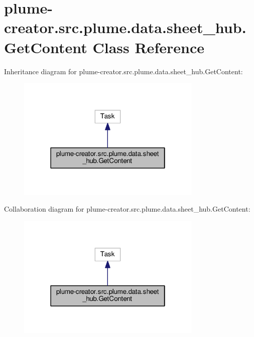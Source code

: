 \hypertarget{classplume-creator_1_1src_1_1plume_1_1data_1_1sheet__hub_1_1_get_content}{}\section{plume-\/creator.src.\+plume.\+data.\+sheet\+\_\+hub.\+Get\+Content Class Reference}
\label{classplume-creator_1_1src_1_1plume_1_1data_1_1sheet__hub_1_1_get_content}


Inheritance diagram for plume-\/creator.src.\+plume.\+data.\+sheet\+\_\+hub.\+Get\+Content\+:\nopagebreak
\begin{figure}[H]
\begin{center}
\leavevmode
\includegraphics[width=250pt]{classplume-creator_1_1src_1_1plume_1_1data_1_1sheet__hub_1_1_get_content__inherit__graph}
\end{center}
\end{figure}


Collaboration diagram for plume-\/creator.src.\+plume.\+data.\+sheet\+\_\+hub.\+Get\+Content\+:\nopagebreak
\begin{figure}[H]
\begin{center}
\leavevmode
\includegraphics[width=250pt]{classplume-creator_1_1src_1_1plume_1_1data_1_1sheet__hub_1_1_get_content__coll__graph}
\end{center}
\end{figure}
